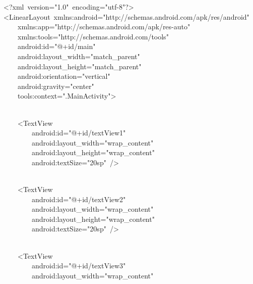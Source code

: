 {\ttfamily\small \textless{}?xml\ version="1.0"\ encoding="utf-8"?\textgreater{}} \\
{\ttfamily\small \textless{}LinearLayout\ xmlns:android="http://schemas.android.com/apk/res/android"} \\
{\ttfamily\small \ \ \ \ xmlns:app="http://schemas.android.com/apk/res-auto"} \\
{\ttfamily\small \ \ \ \ xmlns:tools="http://schemas.android.com/tools"} \\
{\ttfamily\small \ \ \ \ android:id="@+id/main"} \\
{\ttfamily\small \ \ \ \ android:layout\_width="match\_parent"} \\
{\ttfamily\small \ \ \ \ android:layout\_height="match\_parent"} \\
{\ttfamily\small \ \ \ \ android:orientation="vertical"} \\
{\ttfamily\small \ \ \ \ android:gravity="center"} \\
{\ttfamily\small \ \ \ \ tools:context=".MainActivity"\textgreater{}} \\
\strut \\
{\ttfamily\small \ \ \ \ \textless{}TextView} \\
{\ttfamily\small \ \ \ \ \ \ \ \ android:id="@+id/textView1"} \\
{\ttfamily\small \ \ \ \ \ \ \ \ android:layout\_width="wrap\_content"} \\
{\ttfamily\small \ \ \ \ \ \ \ \ android:layout\_height="wrap\_content"} \\
{\ttfamily\small \ \ \ \ \ \ \ \ android:textSize="20sp"\ /\textgreater{}} \\
\strut \\
{\ttfamily\small \ \ \ \ \textless{}TextView} \\
{\ttfamily\small \ \ \ \ \ \ \ \ android:id="@+id/textView2"} \\
{\ttfamily\small \ \ \ \ \ \ \ \ android:layout\_width="wrap\_content"} \\
{\ttfamily\small \ \ \ \ \ \ \ \ android:layout\_height="wrap\_content"} \\
{\ttfamily\small \ \ \ \ \ \ \ \ android:textSize="20sp"\ /\textgreater{}} \\
\strut \\
{\ttfamily\small \ \ \ \ \textless{}TextView} \\
{\ttfamily\small \ \ \ \ \ \ \ \ android:id="@+id/textView3"} \\
{\ttfamily\small \ \ \ \ \ \ \ \ android:layout\_width="wrap\_content"} \\
